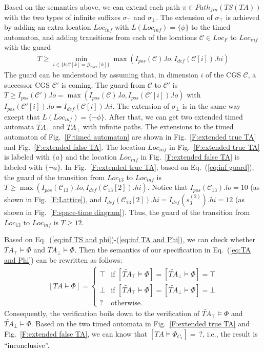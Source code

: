 \documentclass[10pt,conference,compsocconf,letterpaper]{IEEEtran}
\begin{document}
Based on the semantics above, we can extend each path $\pi\in Path_{fin}(TS(TA))$ with the two types of infinite suffixes $\sigma_\top$ and $\sigma_\bot$. The extension of $\sigma_\top$ is achieved by adding an extra location $Loc_{inf}$ with $L(Loc_{inf})=\{\phi\}$ to the timed automaton, and adding transitions from each of the locations $\mathcal{C}\in Loc_F$ to $Loc_{inf}$ with the guard
\begin{eqnarray}\label{eq:inf guard}
T\geq \min\limits_{i\in \{k|\mathcal{C}[k] = \mathcal{G}_{max}[k]\}} {\max(I_{pos}(\mathcal{C}).lo, I_{def}(\mathcal{C}[i]).hi)}
\end{eqnarray}
The guard can be understood by assuming that, in dimension $i$ of the CGS $\mathcal{C}$, a successor CGS $\mathcal{C}'$ is coming. The guard from $\mathcal{C}$ to $\mathcal{C}'$ is $T\geq I_{pos}(\mathcal{C}').lo = \max (I_{pos}(\mathcal{C}).lo, I_{pos}(\mathcal{C}'[i]).lo)$ with $I_{pos}(\mathcal{C}'[i]).lo = I_{def}(\mathcal{C}[i]).hi$. The extension of $\sigma_\bot$ is in the same way except that $L(Loc_{inf})=\{\neg\phi\}$. After that, we can get two extended timed automata $\widetilde{TA}_\top$ and $\widetilde{TA}_\bot$ with infinite paths. The extensions to the timed automaton of Fig.~\ref{F:timed automaton} are shown in Fig.~\ref{F:extended true TA} and Fig.~\ref{F:extended false TA}. The location $Loc_{inf}$ in Fig.~\ref{F:extended true TA} is labeled with $\{a\}$ and the location $Loc_{inf}$ in Fig.~\ref{F:extended false TA} is labeled with $\{\neg a\}$. In Fig.~\ref{F:extended true TA}, based on Eq.~(\ref{eq:inf guard}), the guard of the transition from $Loc_{13}$ to $Loc_{inf}$ is $T\geq \max(I_{pos}(\mathcal{C}_{13}).lo, I_{def}(\mathcal{C}_{13}[2]).hi)$. Notice that $I_{pos}(\mathcal{C}_{13}).lo = 10$ (as shown in Fig.~\ref{F:Lattice}), and $I_{def}(\mathcal{C}_{13}[2]).hi = I_{def}(s^{(2)}_{3}).hi = 12$ (as shown in Fig.~\ref{F:space-time diagram}). Thus, the guard of the transition from $Loc_{13}$ to $Loc_{inf}$ is $T\geq 12$.

Based on Eq.~(\ref{eq:inf TS and phi})-(\ref{eq:inf TA and Phi}), we can check whether $\widetilde{TA}_\top\models \Phi$ and $\widetilde{TA}_\bot\models \Phi$. Then the semantics of our specification in Eq.~(\ref{eq:TA and Phi}) can be rewritten as follows:
\begin{eqnarray}\label{eq:TA and inf TA}
[TA \models \Phi] = \left\{ \begin{array}{ll}
\top & \textrm{if } [\widetilde{TA}_\top\models \Phi]=[\widetilde{TA}_\bot\models \Phi]=\top\\
\bot & \textrm{if } [\widetilde{TA}_\top\models \Phi]=[\widetilde{TA}_\bot\models \Phi]=\bot\\
? & \textrm{otherwise.}
\end{array} \right.
\end{eqnarray}
Consequently, the verification boils down to the verification of $\widetilde{TA}_\top\models \Phi$ and $\widetilde{TA}_\bot\models \Phi$. Based on the two timed automata in Fig.~\ref{F:extended true TA} and Fig.~\ref{F:extended false TA}, we can know that $[TA \models \Phi_{C_1}] =\ ?$, i.e., the result is ``inconclusive''.
\end{document}
